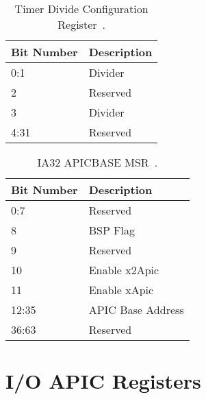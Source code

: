 \begin{table}[H]
  \centering
  \begin{tabularx}{1.0\textwidth}{| X | X |}
    \hline
    \textbf{Bit Number} & \textbf{Description} \\ \hline\hline
    0:1                 & Divider              \\ \hline
    2                   & Reserved             \\ \hline
    3                   & Divider              \\ \hline
    4:31                & Reserved             \\ \hline
  \end{tabularx}
  \caption{Timer Divide Configuration Register~\autocite[sec.~3.11.5.4]{ia32}.}
  \label{tab:lapicregstimerdiv}
\end{table}

\begin{table}[H]
  \centering
  \begin{tabularx}{1.0\textwidth}{| X | X |}
    \hline
    \textbf{Bit Number} & \textbf{Description} \\ \hline\hline
    0:7                 & Reserved             \\ \hline
    8                   & BSP Flag             \\ \hline
    9                   & Reserved             \\ \hline
    10                  & Enable x2Apic        \\ \hline
    11                  & Enable xApic         \\ \hline
    12:35               & APIC Base Address    \\ \hline
    36:63               & Reserved             \\ \hline
  \end{tabularx}
  \caption{IA32\textunderscore{}
    APIC\textunderscore{}BASE MSR~\autocite[sec.~3.11.12.1]{ia32}.
  }
  \label{tab:lapicregsmsr}
\end{table}

\clearpage

\section{I/O APIC Registers}
\label{sec:ioapicregs}

